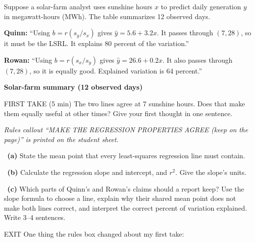 \documentclass[11pt]{article}
\begin{document}
Suppose a solar-farm analyst uses sunshine hours $x$ to predict daily generation $y$ in megawatt-hours (MWh). The table summarizes 12 observed days.\par\smallskip \textbf{Quinn:} ``Using $b=r(s_y/s_x)$ gives $\hat y=5.6+3.2x$. It passes through $(7,28)$, so it must be the LSRL. It explains 80 percent of the variation.''\par \textbf{Rowan:} ``Using $b=r(s_x/s_y)$ gives $\hat y=26.6+0.2x$. It also passes through $(7,28)$, so it is equally good. Explained variation is 64 percent.''\par
\begin{center}
\textbf{Solar-farm summary (12 observed days)}\par\smallskip
{}
\end{center}
\begin{firsttakebox}{FIRST TAKE (5 min)}
The two lines agree at 7 sunshine hours. Does that make them equally useful at other times? Give your first thought in one sentence.\par
{}
\end{firsttakebox}

\textit{Rules callout ``MAKE THE REGRESSION PROPERTIES AGREE (keep on the page)'' is printed on the student sheet.}\par\medskip

~\textbf{(a)} State the mean point that every least-squares regression line must contain.\par
{}

~\textbf{(b)} Calculate the regression slope and intercept, and $r^2$. Give the slope's units.\par
{}

~\textbf{(c)} Which parts of Quinn's and Rowan's claims should a report keep? Use the slope formula to choose a line, explain why their shared mean point does not make both lines correct, and interpret the correct percent of variation explained. Write 3--4 sentences.\par
{}

\begin{summaryexitbox}{EXIT}
One thing the rules box changed about my first take: \hrulefill
\end{summaryexitbox}
\end{document}
